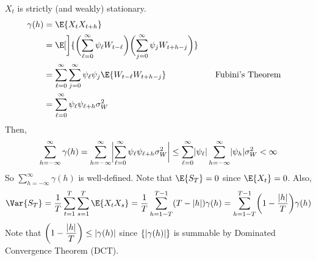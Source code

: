 \begin{Proof}{}{}
    $ X_t $ is strictly (and weakly) stationary.
    \begin{align*}
        \gamma(h)
         & =\E{X_t X_{t+h}}                                                                                                                                          \\
         & =\E[\bigg]{\biggl(\sum_{\ell=0}^{\infty} \psi_\ell W_{t-\ell}\biggr)\biggl(\sum_{j=0}^{\infty} \psi_j W_{t+h-j}\biggr)}                                   \\
         & =\sum_{\ell=0}^{\infty}\sum_{j=0}^{\infty} \psi_\ell\psi_j\E{W_{t-\ell}W_{t+h-j}}                                       & \quad & \text{Fubini's Theorem} \\
         & = \sum_{\ell=0}^{\infty} \psi_\ell \psi_{\ell+h}\sigma_W^2
    \end{align*}
    Then,
    \[ \sum_{h=-\infty}^{\infty} \gamma(h)=\sum_{h=-\infty}^{\infty}
        \abs[\bigg]{\sum_{\ell=0}^{\infty} \psi_\ell \psi_{\ell+h}\sigma_W^2}
        \le \sum_{\ell=0}^{\infty} \abs{\psi_\ell}\sum_{h=-\infty}^{\infty} \abs{\psi_h}\sigma_W^2<\infty \]
    So $ \sum_{h=-\infty}^{\infty} \gamma(h) $ is well-defined.
    Note that $ \E{S_T}=0 $ since $ \E{X_t}=0 $. Also,
    \[ \Var{S_T}=\frac{1}{T} \sum_{t=1}^{T} \sum_{s=1}^{T} \E{X_t X_s}=
        \frac{1}{T} \sum_{h=1-T}^{T-1} (T-\abs{h})\gamma(h)=\sum_{h=1-T}^{T-1}
        \biggl(1-\frac{\abs{h}}{T} \biggr)\gamma(h) \]
    Note that $ \displaystyle \biggl(1-\frac{\abs{h}}{T} \biggr)\le \abs{\gamma(h)} $
    since $ \set{\abs{\gamma(h)}} $ is summable by Dominated Convergence Theorem (DCT).


\end{Proof}
